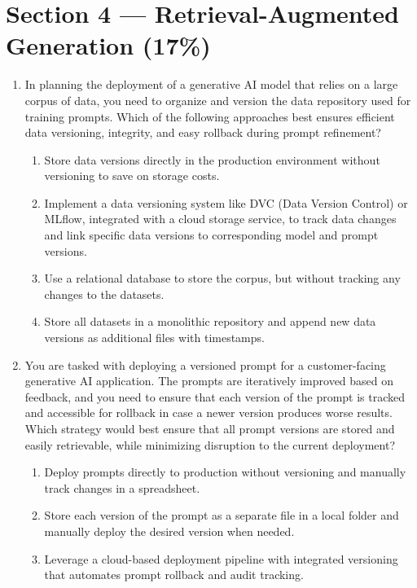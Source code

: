 \section*{Section 4 --- Retrieval-Augmented Generation (17\%)}

\begin{enumerate}[resume,leftmargin=*]
\item In planning the deployment of a generative AI model that relies on a large corpus of data, you need to organize and version the data repository used for training prompts. Which of the following approaches best ensures efficient data versioning, integrity, and easy rollback during prompt refinement?
\begin{enumerate}[label=\Alph*.]
  \item Store data versions directly in the production environment without versioning to save on storage costs.
  \item Implement a data versioning system like DVC (Data Version Control) or MLflow, integrated with a cloud storage service, to track data changes and link specific data versions to corresponding model and prompt versions.
  \item Use a relational database to store the corpus, but without tracking any changes to the datasets.
  \item Store all datasets in a monolithic repository and append new data versions as additional files with timestamps.
\end{enumerate}
\item You are tasked with deploying a versioned prompt for a customer-facing generative AI application. The prompts are iteratively improved based on feedback, and you need to ensure that each version of the prompt is tracked and accessible for rollback in case a newer version produces worse results. Which strategy would best ensure that all prompt versions are stored and easily retrievable, while minimizing disruption to the current deployment?
\begin{enumerate}[label=\Alph*.]
  \item Deploy prompts directly to production without versioning and manually track changes in a spreadsheet.
  \item Store each version of the prompt as a separate file in a local folder and manually deploy the desired version when needed.
  \item Leverage a cloud-based deployment pipeline with integrated versioning that automates prompt rollback and audit tracking.

\end{enumerate}
\end{enumerate}
